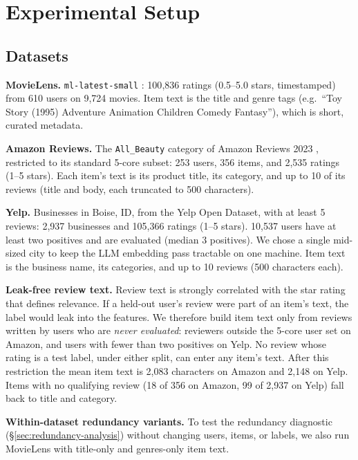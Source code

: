 \section{Experimental Setup}
\label{sec:experimental-setup}

\subsection{Datasets}
\label{sec:datasets}

\textbf{MovieLens.} \texttt{ml-latest-small} \cite{movielens}: 100{,}836
ratings (0.5--5.0 stars, timestamped) from 610 users on 9{,}724 movies.
Item text is the title and genre tags (e.g.\ ``Toy Story (1995) Adventure
Animation Children Comedy Fantasy''), which is short, curated metadata.

\textbf{Amazon Reviews.} The \texttt{All\_Beauty} category of Amazon
Reviews 2023 \cite{amazon-reviews-2023}, restricted to its standard
5-core subset: 253 users, 356 items, and 2{,}535 ratings (1--5 stars).
Each item's text is its product title, its category, and up to 10 of its
reviews (title and body, each truncated to 500 characters).

\textbf{Yelp.} Businesses in Boise, ID, from the Yelp Open Dataset, with
at least 5 reviews: 2{,}937 businesses and 105{,}366 ratings (1--5
stars). 10{,}537 users have at least two positives and are evaluated
(median 3 positives). We chose a single mid-sized city to keep the
LLM embedding pass tractable on one machine. Item text is the business
name, its categories, and up to 10 reviews (500 characters each).

\textbf{Leak-free review text.} Review text is strongly correlated with
the star rating that defines relevance. If a held-out user's review were
part of an item's text, the label would leak into the features. We
therefore build item text only from reviews written by users who are
\emph{never evaluated}: reviewers outside the 5-core user set on Amazon,
and users with fewer than two positives on Yelp. No review whose rating
is a test label, under either split, can enter any item's text. After
this restriction the mean item text is 2{,}083 characters on Amazon and
2{,}148 on Yelp. Items with no qualifying review (18 of 356 on Amazon,
99 of 2{,}937 on Yelp) fall back to title and category.

\textbf{Within-dataset redundancy variants.} To test the redundancy
diagnostic (\S\ref{sec:redundancy-analysis}) without changing users, items, or
labels, we also run MovieLens with title-only and genres-only item
text.

